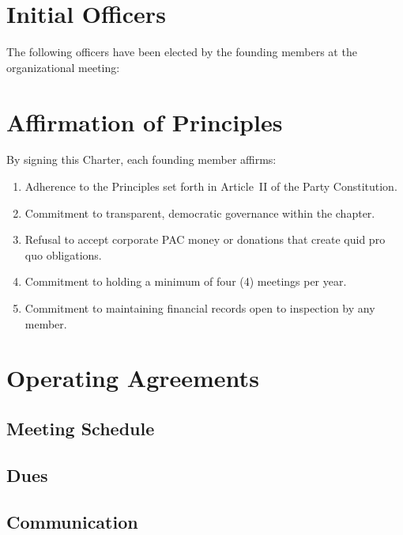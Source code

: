 \documentclass[11pt, letterpaper]{article}
\begin{document}
\section{Initial Officers}

The following officers have been elected by the founding members at the organizational meeting:

\vspace{0.5em}

\section{Affirmation of Principles}

By signing this Charter, each founding member affirms:

\begin{enumerate}
  \item Adherence to the Principles set forth in Article~II of the Party Constitution.
  \item Commitment to transparent, democratic governance within the chapter.
  \item Refusal to accept corporate PAC money or donations that create quid pro quo obligations.
  \item Commitment to holding a minimum of four (4) meetings per year.
  \item Commitment to maintaining financial records open to inspection by any member.
\end{enumerate}

\section{Operating Agreements}

\subsection{Meeting Schedule}

\subsection{Dues}

\subsection{Communication}
\end{document}
